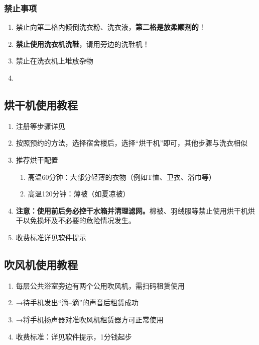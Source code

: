\subsubsection[禁止事项]{禁止事项}
\begin{enumerate}
    \item 禁止向第二格内倾倒洗衣粉、洗衣液，\textbf{第二格是放柔顺剂的}！
    \item \textbf{禁止使用洗衣机洗鞋}，请用旁边的洗鞋机！
    \item 禁止在洗衣机上堆放杂物
    \item \textbf{}
\end{enumerate}

\subsection[烘干机使用教程]{烘干机使用教程}
\label{dry_machine}
\begin{enumerate}
    \item 注册等步骤详见
    \item 按照预约的方法，选择宿舍楼后，选择“烘干机”即可，其他步骤与洗衣相似
    \item 推荐烘干配置
          \begin{enumerate}
              \item 高温60分钟：大部分轻薄的衣物（例如T恤、卫衣、浴巾等）
              \item 高温120分钟：薄被（如夏凉被）
          \end{enumerate}
    \item \textbf{注意：}\textbf{使用前后务必控干水箱并清理滤网。}棉被、羽绒服等禁止使用烘干机烘干以免损坏及不必要的危险情况发生。
    \item 收费标准详见软件提示
\end{enumerate}

\subsection[吹风机使用教程]{吹风机使用教程}
\label{hair_drier}
\begin{enumerate}
    \item 每层公共浴室旁边有两个公用吹风机，需扫码\footnotemark 租赁使用
    \item →待手机发出“滴--滴”的声音后租赁成功
    \item →将手机扬声器对准吹风机租赁器方可正常使用
    \item 收费标准：详见软件提示，1分钱起步
\end{enumerate}

